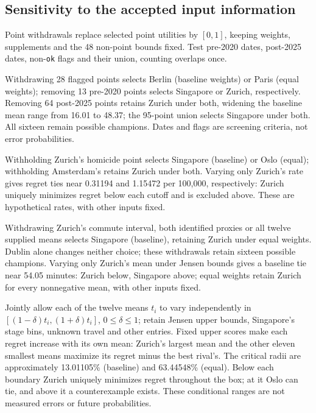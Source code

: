 \subsection{Sensitivity to the accepted input information}\label{sec:sourcepolicy}
Point withdrawals replace selected point utilities by $[0,1]$, keeping weights,
supplements and the 48 non-point bounds fixed. Test pre-2020 dates, post-2025
dates, non-\texttt{ok} flags and their union, counting overlaps once.



Withdrawing 28 flagged points selects Berlin (baseline weights) or Paris
(equal weights); removing 13 pre-2020 points selects Singapore or Zurich,
respectively. Removing 64 post-2025 points retains Zurich under both,
widening the baseline mean range from 16.01 to 48.37; the 95-point union
selects Singapore under both. All sixteen remain possible champions.
Dates and flags are screening criteria, not error probabilities.

Withholding Zurich's homicide point selects Singapore (baseline) or Oslo
(equal); withholding Amsterdam's retains Zurich under both. Varying only
Zurich's rate gives regret ties near 0.31194 and 1.15472 per 100,000,
respectively: Zurich uniquely minimizes regret below each cutoff and is
excluded above. These are hypothetical rates, with other inputs fixed.

Withdrawing Zurich's commute interval, both identified proxies or all twelve
supplied means selects Singapore (baseline), retaining Zurich under equal
weights. Dublin alone changes neither choice; these withdrawals retain sixteen
possible champions. Varying only Zurich's mean under Jensen bounds gives a baseline tie
near 54.05 minutes: Zurich below, Singapore above; equal weights retain
Zurich for every nonnegative mean, with other inputs fixed.

Jointly allow each of the twelve means $t_i$ to vary independently in
$[(1-\delta)t_i,(1+\delta)t_i]$, $0\leq\delta\leq1$; retain Jensen upper bounds,
Singapore's stage bins, unknown travel and other entries. Fixed upper scores
make each regret increase with its own mean: Zurich's largest mean and the
other eleven smallest means maximize its regret minus the best rival's.
The critical radii are approximately 13.01105\% (baseline) and 63.44548\% (equal).
Below each boundary Zurich uniquely minimizes regret throughout the box;
at it Oslo can tie, and above it a counterexample exists.
These conditional ranges are not measured errors or future probabilities.
